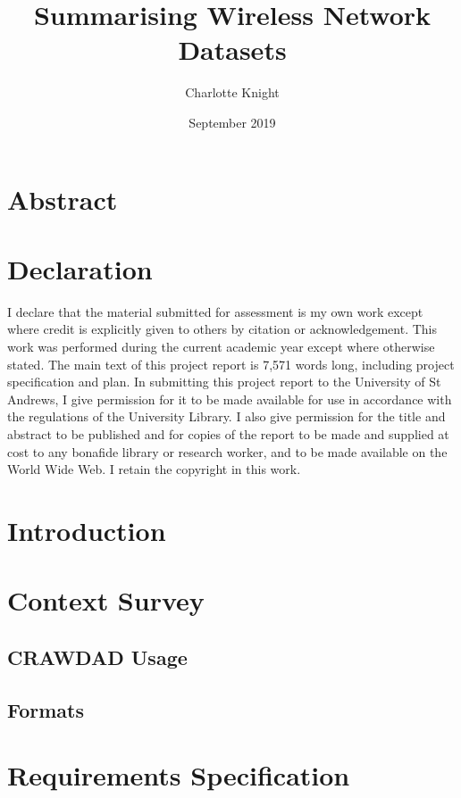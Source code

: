 \documentclass{article}
\title{Summarising Wireless Network Datasets}
\author{Charlotte Knight}
\date{September 2019}
\begin{document}
\maketitle

\section*{Abstract}

\newpage
\section*{Declaration}
I declare that the material submitted for assessment is my own work except where credit is explicitly given to others by citation or acknowledgement. This work was performed during the current academic year except where otherwise stated. 
The main text of this project report is 7,571 words long, including project specification and plan. 
In submitting this project report to the University of St Andrews, I give permission for it to be made available for use in accordance with the regulations of the University Library. I also give permission for the title and abstract to be published and for copies of the report to be made and supplied at cost to any bonafide library or research worker, and to be made available on the World Wide Web. I retain the copyright in this work.

\newpage
\tableofcontents
\newpage

\section{Introduction}


\section{Context Survey}
    \subsection{CRAWDAD Usage}
    
    
    \subsection{Formats}
    

\section{Requirements Specification}

\end{document}
